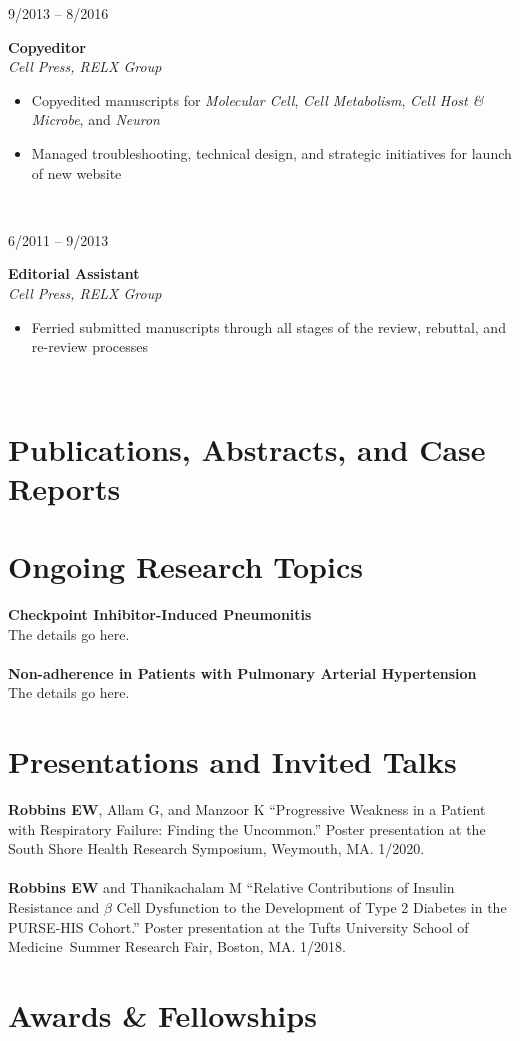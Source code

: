 \documentclass{book}
\newcommand{\entryvspace}{\vspace{0.5em}}
\newcommand{\medschool}{Tufts University School of Medicine}
\newcommand\colleft{.20}
\newcommand\colright{.75}
\newcommand{\entryfour}[4]
{
	\begin{minipage}[t]{\colleft\textwidth}
		\hfill \textsc{#1}
	\end{minipage}
	\hfill\vline\hfill
	\begin{minipage}[t]{\colright\textwidth}
		{\bf#2}\\
		\textit{#3}
		\footnotesize{#4}
	\end{minipage}\\
	\entryvspace
}%
\newcommand{\entrythree}[3]
{
	\begin{minipage}[t]{\colleft\textwidth}
		\hfill \textsc{#1}
	\end{minipage}    
	\hfill\vline\hfill
	\begin{minipage}[t]{\colright\textwidth}
		{\bf#2}\\
		\footnotesize{#3}
	\end{minipage}
	\entryvspace
}%
\begin{document}
		\entryfour{9/2013 -- 8/2016}{Copyeditor}{Cell Press, RELX Group}{%
			\begin{itemize}
				\item Copyedited manuscripts for \emph{Molecular Cell}, \emph{Cell Metabolism}, \emph{Cell Host \& Microbe}, and \emph{Neuron}
				\item Managed troubleshooting, technical design, and strategic initiatives for launch of new website 
			\end{itemize}
		}
		
		\entryfour{6/2011 -- 9/2013}{Editorial Assistant}{Cell Press, RELX Group}{%
			\begin{itemize}
				\item Ferried submitted manuscripts through all stages of the review, rebuttal, and re-review processes
			\end{itemize}
		}
	\section*{Publications, Abstracts, and Case Reports}	
	\printbibliography
  \section*{Ongoing Research Topics}
  \textbf{Checkpoint Inhibitor-Induced Pneumonitis}
  \\
  The details go here.
  \\ \\
  \textbf{Non-adherence in Patients with Pulmonary Arterial Hypertension}
  \\
  The details go here.
  \section*{Presentations and Invited Talks}
	\textbf{Robbins EW}, Allam G, and Manzoor K ``Progressive Weakness in a Patient with Respiratory Failure: Finding the Uncommon.'' Poster presentation at the South Shore Health Research Symposium, Weymouth, MA. 1/2020.
	\\ \\
	\textbf{Robbins EW} and Thanikachalam M ``Relative Contributions of Insulin Resistance and $\beta$ Cell Dysfunction to the Development of Type 2 Diabetes in the PURSE-HIS Cohort.'' Poster presentation at the \medschool \ Summer Research Fair, Boston, MA. 1/2018.
	
	\section*{Awards \& Fellowships}
		
\end{document}
